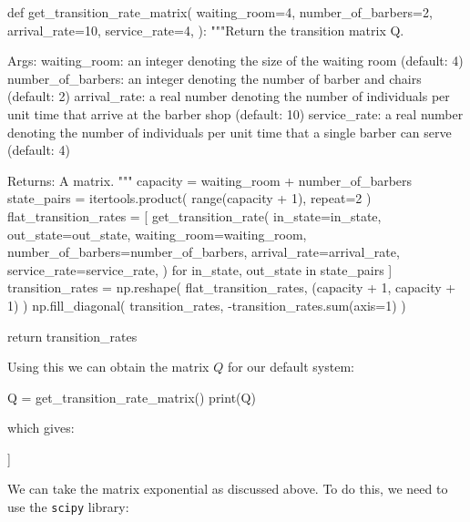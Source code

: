 \begin{pyin}
def get_transition_rate_matrix(
    waiting_room=4,
    number_of_barbers=2,
    arrival_rate=10,
    service_rate=4,
):
    """Return the transition matrix Q.

    Args:
        waiting_room: an integer denoting the size of the
                      waiting room (default: 4)
        number_of_barbers: an integer denoting the number of
                           barber and chairs (default: 2)
        arrival_rate: a real number denoting the number of
                      individuals per unit time that arrive at
                      the barber shop (default: 10)
        service_rate: a real number denoting the number of
                      individuals per unit time that a single
                      barber can serve (default: 4)

    Returns:
        A matrix.
    """
    capacity = waiting_room + number_of_barbers
    state_pairs = itertools.product(
        range(capacity + 1), repeat=2
    )
    flat_transition_rates = [
        get_transition_rate(
            in_state=in_state,
            out_state=out_state,
            waiting_room=waiting_room,
            number_of_barbers=number_of_barbers,
            arrival_rate=arrival_rate,
            service_rate=service_rate,
        )
        for in_state, out_state in state_pairs
    ]
    transition_rates = np.reshape(
        flat_transition_rates, (capacity + 1, capacity + 1)
    )
    np.fill_diagonal(
        transition_rates, -transition_rates.sum(axis=1)
    )

    return transition_rates
\end{pyin}

Using this we can obtain the matrix \(Q\) for our default system:

\begin{pyin}
Q = get_transition_rate_matrix()
print(Q)
\end{pyin}

which gives:

\begin{pyout}
[[-10  10   0   0   0   0   0]
 [  4 -14  10   0   0   0   0]
 [  0   8 -18  10   0   0   0]
 [  0   0   8 -18  10   0   0]
 [  0   0   0   8 -18  10   0]
 [  0   0   0   0   8 -18  10]
 [  0   0   0   0   0   8  -8]]
\end{pyout}

We can take the matrix exponential as
discussed above. To do this, we need to use the \texttt{scipy}
library:

